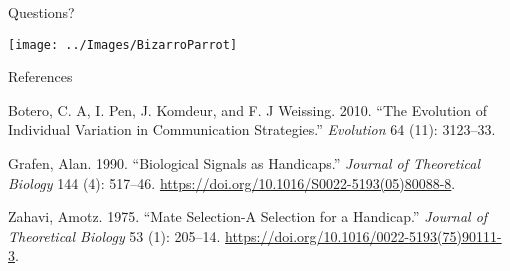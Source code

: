 \documentclass[
  ignorenonframetext,
]{beamer}
\begin{document}
\begin{frame}{Questions?}
\protect\hypertarget{questions}{}

\begin{center}\texttt{[image: ../Images/BizarroParrot]} \end{center}

\end{frame}

\begin{frame}{References}
\protect\hypertarget{references}{}

\hypertarget{refs}{}
\leavevmode\hypertarget{ref-botero_Evolution_2010}{}%
Botero, C. A, I. Pen, J. Komdeur, and F. J Weissing. 2010. ``The
Evolution of Individual Variation in Communication Strategies.''
\emph{Evolution} 64 (11): 3123--33.

\leavevmode\hypertarget{ref-grafen_Biological_1990}{}%
Grafen, Alan. 1990. ``Biological Signals as Handicaps.'' \emph{Journal
of Theoretical Biology} 144 (4): 517--46.
\url{https://doi.org/10.1016/S0022-5193(05)80088-8}.

\leavevmode\hypertarget{ref-zahavi_Mate_1975}{}%
Zahavi, Amotz. 1975. ``Mate Selection-A Selection for a Handicap.''
\emph{Journal of Theoretical Biology} 53 (1): 205--14.
\url{https://doi.org/10.1016/0022-5193(75)90111-3}.

\end{frame}
\end{document}
